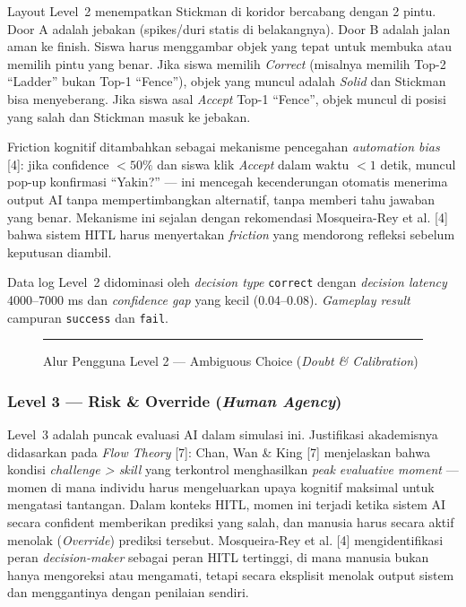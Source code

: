\documentclass[12pt,oneside]{report}
\begin{document}
Layout Level~2 menempatkan Stickman di koridor bercabang dengan 2 pintu. Door A adalah jebakan (spikes/duri statis di belakangnya). Door B adalah jalan aman ke finish. Siswa harus menggambar objek yang tepat untuk membuka atau memilih pintu yang benar. Jika siswa memilih \textit{Correct} (misalnya memilih Top-2 ``Ladder'' bukan Top-1 ``Fence''), objek yang muncul adalah \textit{Solid} dan Stickman bisa menyeberang. Jika siswa asal \textit{Accept} Top-1 ``Fence'', objek muncul di posisi yang salah dan Stickman masuk ke jebakan.

Friction kognitif ditambahkan sebagai mekanisme pencegahan \textit{automation bias} [4]: jika confidence $< 50\%$ dan siswa klik \textit{Accept} dalam waktu $< 1$ detik, muncul pop-up konfirmasi ``Yakin?'' --- ini mencegah kecenderungan otomatis menerima output AI tanpa mempertimbangkan alternatif, tanpa memberi tahu jawaban yang benar. Mekanisme ini sejalan dengan rekomendasi Mosqueira-Rey et al. [4] bahwa sistem HITL harus menyertakan \textit{friction} yang mendorong refleksi sebelum keputusan diambil.

Data log Level~2 didominasi oleh \textit{decision type} \texttt{correct} dengan \textit{decision latency} 4000--7000 ms dan \textit{confidence gap} yang kecil (0.04--0.08). \textit{Gameplay result} campuran \texttt{success} dan \texttt{fail}.

\begin{figure}[H]
    \centering
    \rule{0.9\textwidth}{6cm}
    \caption{Alur Pengguna Level 2 --- Ambiguous Choice (\textit{Doubt \& Calibration})}
    \label{fig:level2-flow}
\end{figure}

\subsubsection{Level 3 --- Risk \& Override (\textit{Human Agency})}

Level~3 adalah puncak evaluasi AI dalam simulasi ini. Justifikasi akademisnya didasarkan pada \textit{Flow Theory} [7]: Chan, Wan \& King [7] menjelaskan bahwa kondisi \textit{challenge > skill} yang terkontrol menghasilkan \textit{peak evaluative moment} --- momen di mana individu harus mengeluarkan upaya kognitif maksimal untuk mengatasi tantangan. Dalam konteks HITL, momen ini terjadi ketika sistem AI secara confident memberikan prediksi yang salah, dan manusia harus secara aktif menolak (\textit{Override}) prediksi tersebut. Mosqueira-Rey et al. [4] mengidentifikasi peran \textit{decision-maker} sebagai peran HITL tertinggi, di mana manusia bukan hanya mengoreksi atau mengamati, tetapi secara eksplisit menolak output sistem dan menggantinya dengan penilaian sendiri.
\end{document}
